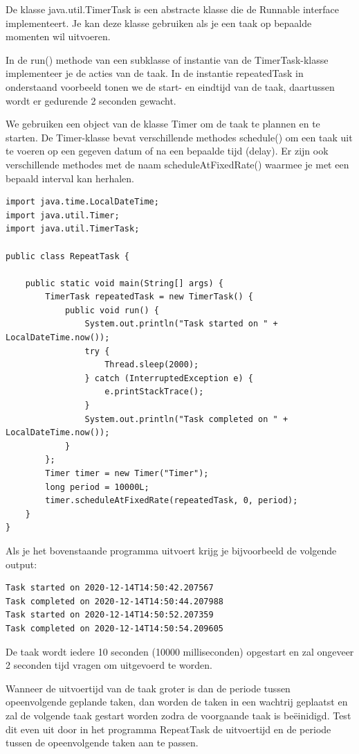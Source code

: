 De klasse java.util.TimerTask is een abstracte klasse die de Runnable interface implementeert. Je kan deze klasse gebruiken als je een taak op bepaalde momenten wil uitvoeren. 

In de run() methode van een subklasse of instantie van de TimerTask-klasse implementeer je de acties van de taak. In de instantie repeatedTask in onderstaand voorbeeld tonen we de start- en eindtijd van de taak, daartussen wordt er gedurende 2 seconden gewacht.

We gebruiken een object van de klasse Timer om de taak te plannen en te starten.
De Timer-klasse bevat verschillende methodes schedule() om een taak uit te voeren op een gegeven datum of na een bepaalde tijd (delay). Er zijn ook verschillende methodes met de naam scheduleAtFixedRate() waarmee je met een bepaald interval kan herhalen. 

\begin{lstlisting}
import java.time.LocalDateTime;
import java.util.Timer;
import java.util.TimerTask;

public class RepeatTask {

	public static void main(String[] args) {
		TimerTask repeatedTask = new TimerTask() {
			public void run() {
				System.out.println("Task started on " + LocalDateTime.now());
				try {
					Thread.sleep(2000);
				} catch (InterruptedException e) {
					e.printStackTrace();
				}
				System.out.println("Task completed on " + LocalDateTime.now());
			}
		};
		Timer timer = new Timer("Timer");
		long period = 10000L;
		timer.scheduleAtFixedRate(repeatedTask, 0, period);
	}
}
\end{lstlisting}

Als je het bovenstaande programma uitvoert krijg je bijvoorbeeld de volgende output:

\begin{verbatim}
Task started on 2020-12-14T14:50:42.207567
Task completed on 2020-12-14T14:50:44.207988
Task started on 2020-12-14T14:50:52.207359
Task completed on 2020-12-14T14:50:54.209605
\end{verbatim}

De taak wordt iedere 10 seconden (10000 milliseconden) opgestart en zal ongeveer 2 seconden tijd vragen om uitgevoerd te worden.

Wanneer de uitvoertijd van de taak groter is dan de periode tussen opeenvolgende geplande taken, dan worden de taken in een wachtrij geplaatst en zal de volgende taak gestart worden zodra de voorgaande taak is be\"einidigd. Test dit even uit door in het programma RepeatTask de uitvoertijd en de periode tussen de opeenvolgende taken aan te passen.

